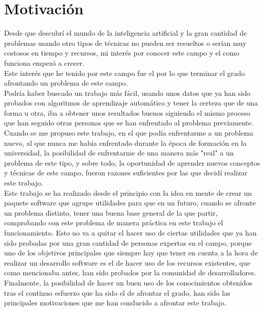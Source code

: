 \section{Motivación}
Desde que descubrí el mundo de la inteligencia artificial y la gran cantidad de problemas usando otro tipos de técnicas no pueden ser resueltos o serían muy costosos en tiempo y recursos, mi interés por conocer este campo y el como funciona empezó a crecer.\\ Este interés que he tenido por este campo fue el por lo que terminar el grado afrontando un problema de este campo.\\
\linebreak
Podría haber buscado un trabajo más fácil, usando unos datos que ya han sido probados con algoritmos de aprendizaje automático y tener la certeza que de una forma u otra, iba a obtener unos resultados buenos siguiendo el mismo proceso que han seguido otras personas que se han enfrentado al problema previamente. Cuando se me propuso este trabajo, en el que podía enfrentarme a un problema nuevo, al que nunca me había enfrentado durante la época de formación en la universidad, la posibilidad de enfrentarme de una manera más "real" a un problema de este tipo, y sobre todo, la oportunidad de aprender nuevos conceptos y técnicas de este campo, fueron razones suficientes por las que decidí realizar este trabajo.\\
\linebreak
Este trabajo se ha realizado desde el principio con la idea en mente de crear un paquete software que agrupe utilidades para que en un futuro, cuando se afronte un problema distinto, tener una buena base general de la que partir, comprobando con  este problema de manera práctica en este trabajo el funcionamiento. Esto no va a quitar el hacer uso de ciertas utilidades que ya han sido probadas por una gran cantidad de personas expertas en el campo, porque uno de los objetivos principales que siempre hay que tener en cuenta a la hora de realizar un desarrollo software es el de hacer uso de los recursos existentes, que como mencionaba antes, han sido probados por la comunidad de desarrolladores.\\ 
\linebreak
Finalmente, la posibilidad de hacer un buen uso de los conocimientos obtenidos tras el continuo esfuerzo que ha sido el de afrontar el grado, han sido las principales motivaciones que me han conducido a afrontar este trabajo.
\pagebreak
